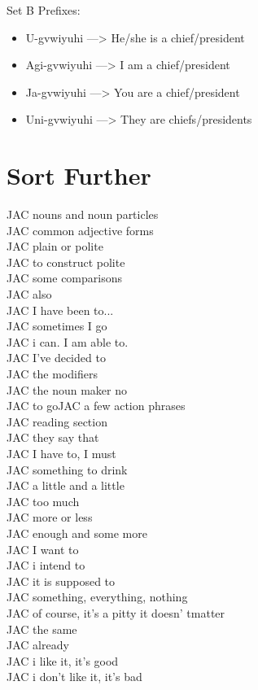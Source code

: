 \begin{multicols}
\noindent Set B Prefixes:
\begin{itemize}
\item U-gvwiyuhi —> He/she is a chief/president
\item Agi-gvwiyuhi —> I am a chief/president
\item Ja-gvwiyuhi —> You are a chief/president
\item Uni-gvwiyuhi —> They are chiefs/presidents
\end{itemize}
\chapter{Sort Further}
JAC nouns and noun particles\\
JAC common adjective forms\\
JAC plain or polite\\
JAC to construct polite\\
JAC some comparisons\\
JAC also\\
JAC I have been to...\\
JAC sometimes I go\\
JAC i can.  I am able to.\\
JAC I've decided to\\
JAC the modifiers\\
JAC the noun maker no\\
JAC to goJAC a few action phrases\\
JAC reading section\\
JAC they say that\\
JAC I have to, I must\\
JAC something to drink\\
JAC a little and a little\\
JAC too much\\
JAC more or less\\
JAC enough and some more\\
JAC I want to\\
JAC i intend to\\
JAC it is supposed to\\
JAC something, everything, nothing\\
JAC of course, it's a pitty it doesn' tmatter\\
JAC the same\\
JAC already\\
JAC i like it, it's good\\
JAC i don't like it, it's bad\\

\end{multicols}
